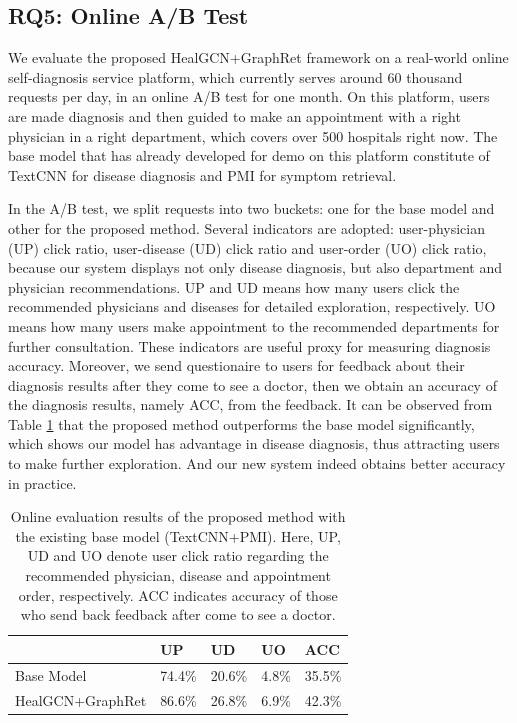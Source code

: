 \documentclass[sigconf]{acmart}
\begin{document}
\subsection{RQ5: Online A/B Test}
We evaluate the proposed HealGCN+GraphRet framework on a real-world online self-diagnosis service platform, which currently serves around 60 thousand requests per day, in an online A/B test for one month. On this platform, users are made diagnosis and then guided to make an appointment with a right physician in a right department, which covers over 500 hospitals right now. The base model that has already developed for demo on this platform constitute of TextCNN for disease diagnosis and PMI for symptom retrieval. 

In the A/B test, we split requests into two buckets: one for the base model and other for the proposed method. Several indicators are adopted: user-physician (UP) click ratio, user-disease (UD) click ratio and user-order (UO) click ratio, because our system displays not only disease diagnosis, but also department and physician recommendations. UP and UD means how many users click the recommended physicians and diseases for detailed exploration, respectively. UO means how many users make appointment to the recommended departments for further consultation. These indicators are useful proxy for measuring diagnosis accuracy. Moreover, we send questionaire to users for feedback about their diagnosis results after they come to see a doctor, then we obtain an accuracy of the diagnosis results, namely ACC, from the feedback. It can be observed from Table \ref{tab:abtest} that the proposed method outperforms the base model significantly, which shows our model has advantage in disease diagnosis, thus attracting users to make further exploration. And our new system indeed obtains better accuracy in practice.

\begin{table}[t]
  \centering
  \caption{Online evaluation results of the proposed method with the existing base model (TextCNN+PMI). Here, UP, UD and UO denote user click ratio regarding the recommended physician, disease and appointment order, respectively. ACC indicates accuracy of those who send back feedback after come to see a doctor.}
    \begin{tabular}{lrrrr}
\toprule
          & \multicolumn{1}{l}{UP} & \multicolumn{1}{l}{UD} & \multicolumn{1}{l}{UO} & \multicolumn{1}{l}{ACC}\\
\midrule
    Base Model& 74.4\% & 20.6\% & 4.8\% & 35.5\% \\
    HealGCN+GraphRet &	86.6\% & 26.8\% & 6.9\% & 42.3\% \\
\bottomrule
    \end{tabular}%
  \label{tab:abtest}%
\end{table}%
\end{document}

